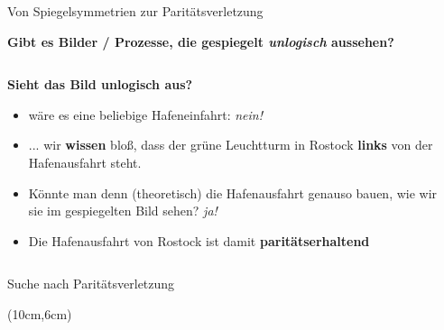 \begin{frame}{Von Spiegelsymmetrien zur Parit\"atsverletzung}
    \begin{center}
        \textbf{Gibt es Bilder / Prozesse, die gespiegelt {\color{vertexDarkRed}\textit{unlogisch}} aussehen?}
    \end{center}

	\begin{columns}[T]
		\begin{column}{.6\textwidth}
            \textbf{Sieht das Bild unlogisch aus?}
            \begin{itemize}
                \item<1-> w\"are es eine beliebige Hafeneinfahrt: {\color{vertexDarkRed}\textit{nein!}}
                \item<1-> ... wir \textbf{wissen} blo\ss{}, dass der gr\"une Leuchtturm in Rostock \textbf{links} von der Hafenausfahrt steht.
                \item<2-> K\"onnte man denn (theoretisch) die Hafenausfahrt genauso bauen, wie wir sie im gespiegelten Bild sehen? {\color{vertexDarkRed}\textit{ja!}}
                \item<3-> Die Hafenausfahrt von Rostock ist damit \textbf{parit\"atserhaltend}
            \end{itemize}
		\end{column}
		\begin{column}{.4\textwidth}
			\centering
		\end{column}
    \end{columns}
\end{frame}

\begin{frame}{Suche nach Parit\"atsverletzung}
    \centering
    \begin{textblock*}{5cm}(10cm,6cm)
    \end{textblock*}
\end{frame}

